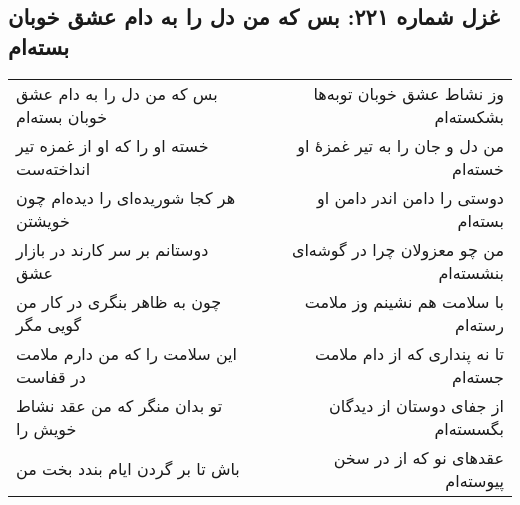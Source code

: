 \begin{center}
\section*{غزل شماره ۲۲۱: بس که من دل را به دام عشق خوبان بسته‌ام}
\label{sec:221}
\begin{longtable}{l p{0.5cm} r}
بس که من دل را به دام عشق خوبان بسته‌ام
&&
وز نشاط عشق خوبان توبه‌ها بشکسته‌ام
\\
خسته او را که او از غمزه تیر انداخته‌ست
&&
من دل و جان را به تیر غمزهٔ او خسته‌ام
\\
هر کجا شوریده‌ای را دیده‌ام چون خویشتن
&&
دوستی را دامن اندر دامن او بسته‌ام
\\
دوستانم بر سر کارند در بازار عشق
&&
من چو معزولان چرا در گوشه‌ای بنشسته‌ام
\\
چون به ظاهر بنگری در کار من گویی مگر
&&
با سلامت هم نشینم وز ملامت رسته‌ام
\\
این سلامت را که من دارم ملامت در قفاست
&&
تا نه پنداری که از دام ملامت جسته‌ام
\\
تو بدان منگر که من عقد نشاط خویش را
&&
از جفای دوستان از دیدگان بگسسته‌ام
\\
باش تا بر گردن ایام بندد بخت من
&&
عقدهای نو که از در سخن پیوسته‌ام
\\
\end{longtable}
\end{center}
